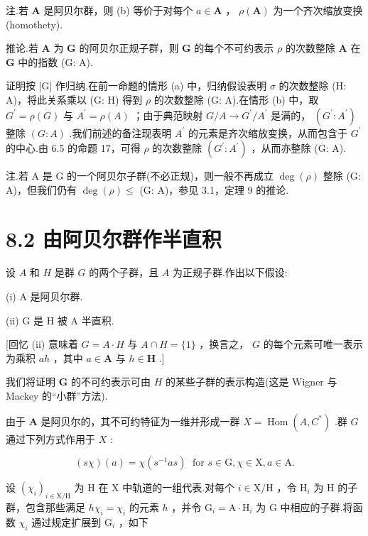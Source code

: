 \documentclass[10pt]{article}
\begin{document}
注.若 \(\mathbf{A}\) 是阿贝尔群，则 (b) 等价于对每个 \(a \in  \mathbf{A}\) ， \(\rho \left( \mathbf{A}\right)\) 为一个齐次缩放变换(homothety).

推论.若 \(\mathbf{A}\) 为 \(\mathbf{G}\) 的阿贝尔正规子群，则 \(\mathbf{G}\) 的每个不可约表示 \(\rho\) 的次数整除 \(\mathbf{A}\) 在 \(\mathbf{G}\) 中的指数 (G: A).

证明按 |G| 作归纳.在前一命题的情形 (a) 中，归纳假设表明 \(\sigma\) 的次数整除 (H: A)，将此关系乘以 (G: H) 得到 \(\rho\) 的次数整除 (G: A).在情形 (b) 中，取 \({G}^{\prime } = \rho \left( G\right)\) 与 \({A}^{\prime } = \rho \left( A\right)\) ；由于典范映射 \(G/A \rightarrow  {G}^{\prime }/{A}^{\prime }\) 是满的， \(\left( {{G}^{\prime } : {A}^{\prime }}\right)\) 整除 \(\left( {G : A}\right)\) .我们前述的备注现表明 \({A}^{\prime }\) 的元素是齐次缩放变换，从而包含于 \({G}^{\prime }\) 的中心.由 6.5 的命题 17，可得 \(\rho\) 的次数整除 \(\left( {{G}^{\prime } : {A}^{\prime }}\right)\) ，从而亦整除 (G: A).

注.若 A 是 G 的一个阿贝尔子群(不必正规)，则一般不再成立 \(\deg \left( \rho \right)\) 整除 (G: A)，但我们仍有 \(\deg \left( \rho \right)  \leq\) (G: A)，参见 3.1，定理 9 的推论.

\section*{8.2 由阿贝尔群作半直积}

设 \(A\) 和 \(H\) 是群 \(G\) 的两个子群，且 \(A\) 为正规子群.作出以下假设:

(i) A 是阿贝尔群.

(ii) \(\mathrm{G}\) 是 \(\mathrm{H}\) 被 \(\mathrm{A}\) 半直积.

[回忆 (ii) 意味着 \(G = A \cdot  H\) 与 \(A \cap  H = \{ 1\}\) ，换言之， \(G\) 的每个元素可唯一表示为乘积 \({ah}\) ，其中 \(a \in  \mathbf{A}\) 与 \(h \in  \mathbf{H}\) .]

我们将证明 \(\mathbf{G}\) 的不可约表示可由 \(H\) 的某些子群的表示构造(这是 Wigner 与 Mackey 的“小群”方法).

由于 \(\mathbf{A}\) 是阿贝尔的，其不可约特征为一维并形成一群 \(X = \operatorname{Hom}\left( {A,{C}^{ * }}\right)\) .群 \(G\) 通过下列方式作用于 \(X\) :

\[
\left( {s\chi }\right) \left( a\right)  = \chi \left( {{s}^{-1}{as}}\right) \;\text{ for }s \in  \mathrm{G},\chi  \in  \mathrm{X},a \in  \mathrm{A}.
\]

设 \({\left( {\chi }_{i}\right) }_{i \in  \mathrm{X}/\mathrm{H}}\) 为 \(\mathrm{H}\) 在 \(\mathrm{X}\) 中轨道的一组代表.对每个 \(i \in  \mathrm{X}/\mathrm{H}\) ，令 \({\mathrm{H}}_{i}\) 为 \(\mathrm{H}\) 的子群，包含那些满足 \(h{\chi }_{i} = {\chi }_{i}\) 的元素 \(h\) ，并令 \({\mathrm{G}}_{i} = \mathrm{A} \cdot  {\mathrm{H}}_{i}\) 为 G 中相应的子群.将函数 \({\chi }_{i}\) 通过规定扩展到 \({\mathrm{G}}_{i}\) ，如下
\end{document}
